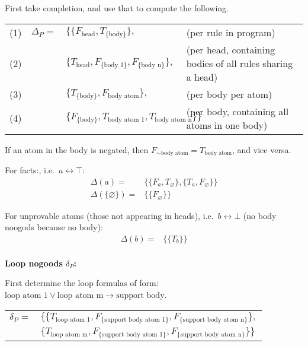\documentclass[9pt,a4paper,landscape]{article}
\newcommand{\ngtb}[1]{T_{ \{#1\} }}
\newcommand{\ngfb}[1]{F_{ \{#1\} }}
\newcommand{\ngta}[1]{T_{#1}}
\newcommand{\ngfa}[1]{F_{#1}}
\begin{document}
{First take completion, and use that to compute the following.

\begin{center}
	\begin{tabular}{lrll}
	(1) & $\Delta_P =$ 	& $\{ \{ \ngfa{\text{head}}, \ngtb{\text{body}} \},$ & (per rule in program) \\
	(2) &				& $\{ \ngta{\text{head}}, \ngfb{\text{body 1}}, \ngfb{\text{body n}} \},$ & (per head, containing bodies of all rules sharing a head) \\
	(3) &				& $\{ \ngtb{\text{body}}, \ngfa{\text{body atom}} \},$ & (per body per atom)\\
	(4) &				& $\{ \ngfb{\text{body}}, \ngta{\text{body atom 1}}, \ngta{\text{body atom n}} \} \}$ & (per body, containing all atoms in one body)
\end{tabular}
\end{center}

If an atom in the body is negated, then $\ngfa{\sim \text{body atom}} = \ngta{\text{body atom}}$, and vice versa.

For facts:, i.e.\ $a \leftrightarrow \top$:
\begin{align*}
\Delta (a) = & \{ \{ \ngfa{a}, \ngta{\varnothing} \}, \{ \ngta{a}, \ngfa{\varnothing} \} \} \\
\Delta (\{\varnothing\}) = & \{ \{ \ngfa{\varnothing} \} \}
\end{align*}

For unprovable atoms (those not appearing in heads), i.e.\ $b \leftrightarrow \bot$ (no body noogods because no body):
\begin{align*}
\Delta (b) = & \{ \{ \ngta{b} \} \} \\
\end{align*}

\vspace{\baselineskip}
\textbf{Loop nogoods $\delta_P$:}
 
First determine the loop formulas of form: $\text{loop atom 1} \lor \text{loop atom m} \rightarrow \text{support body}$.

\begin{center}
	\begin{tabular}{rl}
		$\delta_P =$ 	& $\{ \{ \ngta{\text{loop atom 1}}, \ngfb{\text{support body atom 1}}, \ngfb{\text{support body atom n}} \},$ \\
						& $\{ \ngta{\text{loop atom m}}, \ngfb{\text{support body atom 1}}, \ngfb{\text{support body atom n}} \} \}$ \\
	\end{tabular}
\end{center}

}
\end{document}
